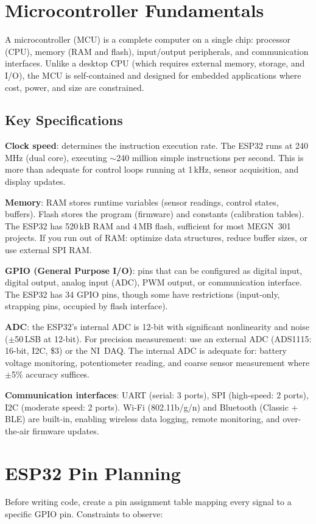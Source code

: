 \section{Microcontroller Fundamentals}
A microcontroller (MCU) is a complete computer on a single chip: processor (CPU), memory (RAM and flash), input/output peripherals, and communication interfaces. Unlike a desktop CPU (which requires external memory, storage, and I/O), the MCU is self-contained and designed for embedded applications where cost, power, and size are constrained.

\subsection{Key Specifications}
\textbf{Clock speed}: determines the instruction execution rate. The ESP32 runs at 240\,MHz (dual core), executing $\sim$240 million simple instructions per second. This is more than adequate for control loops running at 1\,kHz, sensor acquisition, and display updates.

\textbf{Memory}: RAM stores runtime variables (sensor readings, control states, buffers). Flash stores the program (firmware) and constants (calibration tables). The ESP32 has 520\,kB RAM and 4\,MB flash, sufficient for most MEGN~301 projects. If you run out of RAM: optimize data structures, reduce buffer sizes, or use external SPI RAM.

\textbf{GPIO (General Purpose I/O)}: pins that can be configured as digital input, digital output, analog input (ADC), PWM output, or communication interface. The ESP32 has 34 GPIO pins, though some have restrictions (input-only, strapping pins, occupied by flash interface).

\textbf{ADC}: the ESP32's internal ADC is 12-bit with significant nonlinearity and noise ($\pm$50\,LSB at 12-bit). For precision measurement: use an external ADC (ADS1115: 16-bit, I2C, \$3) or the NI~DAQ. The internal ADC is adequate for: battery voltage monitoring, potentiometer reading, and coarse sensor measurement where $\pm$5\% accuracy suffices.

\textbf{Communication interfaces}: UART (serial: 3 ports), SPI (high-speed: 2 ports), I2C (moderate speed: 2 ports). Wi-Fi (802.11b/g/n) and Bluetooth (Classic + BLE) are built-in, enabling wireless data logging, remote monitoring, and over-the-air firmware updates.

\section{ESP32 Pin Planning}
Before writing code, create a pin assignment table mapping every signal to a specific GPIO pin. Constraints to observe:

